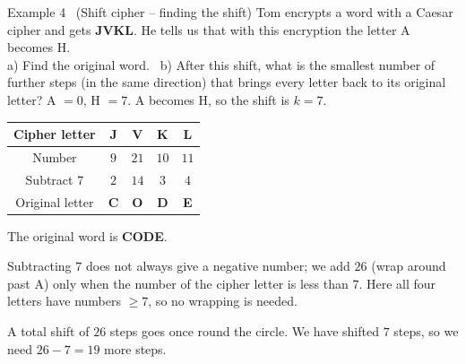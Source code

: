\begin{exbox}{Example 4 \ (Shift cipher -- finding the shift)}
Tom encrypts a word with a Caesar cipher and gets \textbf{JVKL}. He tells us that with this encryption the letter A becomes H.\\
a) Find the original word. \ b) After this shift, what is the smallest number of further steps (in the same direction) that brings every
letter back to its original letter?
\guide
{}
A $= 0$, H $= 7$. A becomes H, so the shift is $k = 7$.
\begin{center}
\begin{tabular}{|c|c|c|c|c|}
\hline
\rowcolor{tmBlue!10} Cipher letter & J & V & K & L \\ \hline
Number & $9$ & $21$ & $10$ & $11$ \\ \hline
Subtract $7$ & $2$ & $14$ & $3$ & $4$ \\ \hline
Original letter & \textbf{C} & \textbf{O} & \textbf{D} & \textbf{E} \\ \hline
\end{tabular}
\end{center}
The original word is \textbf{CODE}.
\begin{warnbox}Subtracting $7$ does not always give a negative number; we add $26$ (wrap around past A) only when the number of the
cipher letter is less than $7$. Here all four letters have numbers $\ge 7$, so no wrapping is needed.\end{warnbox}
A total shift of $26$ steps goes once round the circle. We have shifted $7$ steps, so we need $26 - 7 = 19$ more steps.
\end{exbox}

